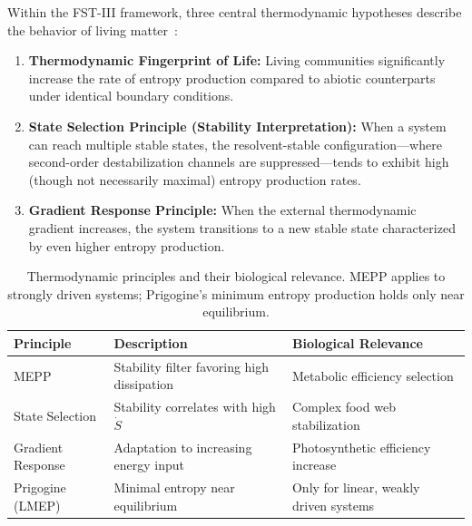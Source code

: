 \documentclass[12pt,a4paper]{article}
\theoremstyle{remark}
\begin{document}
Within the FST-III framework, three central thermodynamic hypotheses describe the behavior of living matter~\citep{EcosystemMEPP}:

\begin{enumerate}
    \item \textbf{Thermodynamic Fingerprint of Life:} Living communities significantly increase the rate of entropy production compared to abiotic counterparts under identical boundary conditions.

    \item \textbf{State Selection Principle (Stability Interpretation):} When a system can reach multiple stable states, the resolvent-stable configuration---where second-order destabilization channels are suppressed---tends to exhibit high (though not necessarily maximal) entropy production rates.

    \item \textbf{Gradient Response Principle:} When the external thermodynamic gradient increases, the system transitions to a new stable state characterized by even higher entropy production.
\end{enumerate}

\begin{table}[htbp]
\centering
\caption{Thermodynamic principles and their biological relevance. MEPP applies to strongly driven systems; Prigogine's minimum entropy production holds only near equilibrium.}
\label{tab:thermo-principles}
\begin{tabularx}{\textwidth}{@{}L{0.21\textwidth} L{0.28\textwidth} Y@{}}
\toprule
\textbf{Principle} & \textbf{Description} & \textbf{Biological Relevance} \\
\midrule
MEPP & Stability filter favoring high dissipation & Metabolic efficiency selection \\
State Selection & Stability correlates with high $\dot{S}$ & Complex food web stabilization \\
Gradient Response & Adaptation to increasing energy input & Photosynthetic efficiency increase \\
Prigogine (LMEP) & Minimal entropy near equilibrium & Only for linear, weakly driven systems \\
\bottomrule
\end{tabularx}
\end{table}
\end{document}
